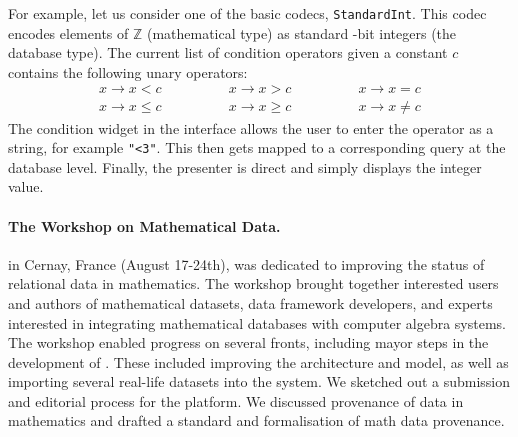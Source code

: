 For example, let us consider one of the basic codecs, \texttt{StandardInt}.
This codec encodes elements of $\mathbb{Z}$ (mathematical type) 
as standard -bit integers (the database type).
The current list of condition operators given a constant $c$ contains the following unary operators:
$$
\begin{array}{ccc}
x \rightarrow x < c \qquad & \qquad x \rightarrow x > c \qquad & \qquad x \rightarrow x = c \\
x \rightarrow x \leq c \qquad & \qquad x \rightarrow x \geq c \qquad & \qquad x \rightarrow x \neq c
\end{array}
$$
The condition widget in the interface allows the user to enter the operator as a string,
for example \texttt{"<3"}.
This then gets mapped to a corresponding query at the database level.
Finally, the presenter is direct and simply displays the integer value.


\paragraph{The Workshop on Mathematical Data.}
 in Cernay, France (August 17-24th),
was dedicated to improving the status of relational data in mathematics.
The workshop brought together interested users and authors of mathematical datasets, 
data framework developers, 
and experts interested in integrating mathematical databases with computer algebra systems.
The workshop enabled progress on several fronts,
including mayor steps in the development of \dmh.
These included improving the architecture and model, 
as well as importing several real-life datasets into the system.
We sketched out a submission and editorial process for the platform.
We discussed provenance of data in mathematics and
drafted a standard and formalisation of math data provenance.

